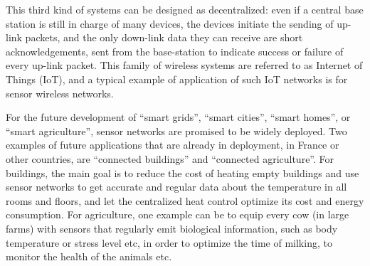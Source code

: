 %
%
This third kind of systems can be designed as decentralized:
even if a central base station is
still in charge of many devices,
the devices initiate the sending of up-link packets, and the only down-link data they can receive are short acknowledgements, sent from the base-station to indicate success or failure of every up-link packet.
This family of wireless systems are referred to as Internet of Things (IoT),
and a typical example of application of such IoT networks is for sensor wireless networks.

For the future development of ``smart grids'', ``smart cities'', ``smart homes'', or ``smart agriculture'', sensor networks are promised to be widely deployed.
Two examples of future applications that are already in deployment, in France or other countries, are ``connected buildings'' and ``connected agriculture''.
For buildings, the main goal is to reduce the cost of heating empty buildings and use sensor networks to get accurate and regular data about the temperature in all rooms and floors, and let the centralized heat control optimize its cost and energy consumption.
For agriculture, one example can be to equip every cow (in large farms) with sensors that regularly emit biological information, such as body temperature or stress level etc, in order to optimize the time of milking, to monitor the health of the animals etc.
%

